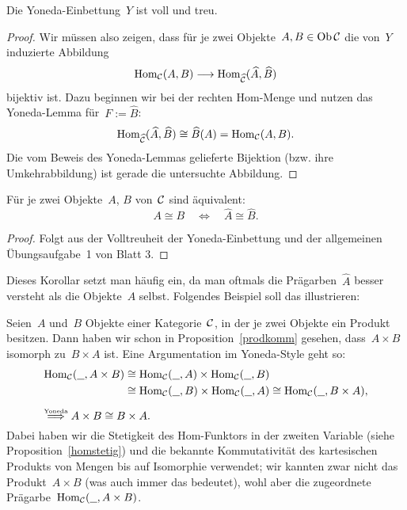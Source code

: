 \begin{kor}Die Yoneda-Einbettung~$Y$ ist voll und treu.\end{kor}
\begin{proof}
Wir müssen also zeigen, dass für je zwei Objekte~$A,B \in \operatorname{Ob}\mathcal{C}$ die von~$Y$
induzierte Abbildung
\[ \mathrm{Hom}_{\mathcal{C}}(A,B) \longrightarrow \mathrm{Hom}_{\widehat{\mathcal{C}}}(\widehat A,\widehat B) \]
bijektiv ist. Dazu beginnen wir bei der rechten Hom-Menge und nutzen das
Yoneda-Lemma für~$F := \widehat B$:
\[ \mathrm{Hom}_{\widehat{\mathcal{C}}}(\widehat A,\widehat B) \cong \widehat B(A) = \mathrm{Hom}_{\mathcal{C}}(A,B). \]
Die vom Beweis des Yoneda-Lemmas gelieferte Bijektion (bzw. ihre
Umkehrabbildung) ist gerade die untersuchte Abbildung.
\end{proof}

\begin{kor}Für je zwei Objekte~$A$, $B$ von~$\mathcal{C}$ sind äquivalent:
\[ A \cong B \quad\Longleftrightarrow\quad \widehat A \cong \widehat B. \]
\end{kor}
\begin{proof}Folgt aus der Volltreuheit der Yoneda-Einbettung und der
allgemeinen Übungs\-auf\-ga\-be~1 von Blatt 3.\end{proof}

Dieses Korollar setzt man häufig ein, da man
oftmals die Prägarben~$\widehat A$ besser versteht als die Objekte~$A$ selbst.
Folgendes Beispiel soll das illustrieren:
\begin{bsp}Seien~$A$ und~$B$ Objekte einer Kategorie~$\mathcal{C}$, in der je zwei
Objekte ein Produkt besitzen. Dann haben wir schon in Proposition~\ref{prodkomm}
gesehen, dass~$A \times B$ isomorph zu~$B \times A$ ist. Eine Argumentation im
Yoneda-Style geht so:
\begin{align*}
  \Hom_\C(\freist, A \times B) &\cong
  \Hom_\C(\freist, A) \times \Hom_\C(\freist, B) \\
  &\cong \Hom_\C(\freist, B) \times \Hom_\C(\freist, A) \cong
  \Hom_\C(\freist, B \times A), \\[0.5em]
  \omit\rlap{$\stackrel{\text{\tiny Yoneda}}{\Longrightarrow} A \times B \cong B \times A.$}
\end{align*}
Dabei haben wir die Stetigkeit des Hom-Funktors in der zweiten Variable (siehe
Proposition~\ref{homstetig}) und die bekannte Kommutativität des kartesischen
Produkts von Mengen bis auf Isomorphie verwendet; wir kannten zwar nicht das
Produkt~$A \times B$ (was auch immer das bedeutet), wohl aber die zugeordnete
Prägarbe~$\mathrm{Hom}_{\mathcal{C}}(\underline{\ \ }, A \times B)$.
\end{bsp}


